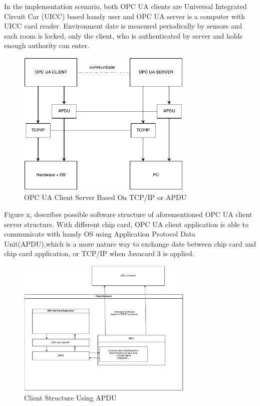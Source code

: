 \documentclass[]{llncs}
\begin{document}
In the implementation scenario, both OPC UA clients are Universal Integrated Circuit Car (UICC)  based handy user and OPC UA server is a computer with UICC card reader. Environment date is measured periodically by sensors and each room is locked, only the client, who is authenticated by server and holds enough authority can enter.
 \begin{figure}[ht]
	\centering
	\includegraphics[width=0.75\textwidth]{softwareStructure}
		\caption[ ]{OPC UA Client Server Based On TCP/IP or APDU}
	\label{fig:softwareStructure}
\end{figure}
Figure x, describes possible software structure of aforementioned OPC UA client server structure. With different chip card, OPC UA client application is able to communicate with handy OS using Application Protocol Data Unit(APDU),which is a more nature way to exchange date between chip card and chip card application, or TCP/IP when Javacard 3 is applied.  
 \begin{figure}
	\centering
	\includegraphics[width=0.75\textwidth]{clientStructure}
		\caption[ ]{Client Structure Using APDU}
	\label{fig:clientStructure}
\end{figure}
\end{document}
